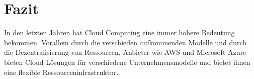 \section{Fazit}
In den letzten Jahren hat Cloud Computing eine immer höhere Bedeutung bekommen.
Vorallem durch die verschieden aufkommenden Modelle und durch die Dezentralisierung von Ressourcen. 
Anbieter wie AWS und Microsoft Azure bieten Cloud Lösungen für verschiedene Unternehmensmodelle und bietet ihnen eine flexible Ressourceninfrastruktur. 

